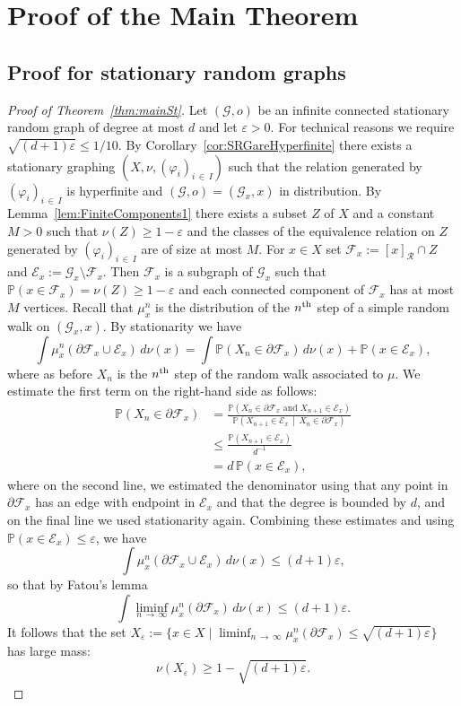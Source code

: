 \documentclass[10pt]{amsart}
\theoremstyle{definition}\newtheorem{defi}[theo]{Definition}\newtheorem{rema}[theo]{Remark}\newtheorem{exam}[theo]{Example}\newtheorem{exem}[theo]{Example}\newtheorem{nota}[theo]{Notation}
\newcommand{\bbP}{\mathbb{P}}
\newcommand{\calR}{\mathcal{R}}
\newcommand{\calE}{\mathcal{E}}
\newcommand{\calF}{\mathcal{F}}
\newcommand{\calG}{\mathcal{G}}
\begin{document}
\section{Proof of the Main Theorem}\label{sec:main_proof}

\subsection{Proof for stationary random graphs}\label{sec:stat_proof}

\begin{proof}[{Proof of Theorem~\ref{thm:mainSt}}]
Let $(\calG,o)$ be an infinite connected stationary random graph of degree at most $d$ and let $\varepsilon>0$. For technical reasons we require $\sqrt{(d+1)\varepsilon}\leq 1/10.$ By Corollary~\ref{cor:SRGareHyperfinite} there exists a stationary graphing $(X,\nu,(\varphi_i)_{i\,\in\,I})$ such that the relation generated by $ (\varphi_i)_{i\,\in\,I}$ is hyperfinite and $(\calG,o)=(\calG_x,x)$ in distribution. By Lemma~\ref{lem:FiniteComponents1} there exists a subset $Z$ of $X$ and a constant $M>0$ such that $\nu(Z)\geq 1-\varepsilon$ and the classes of the equivalence relation on $Z$ generated by $(\varphi_i)_{i\,\in\,I}$ are of size at most $M$. For $x\in X$ set $\calF_x:=[x]_{\calR}\cap Z$ and $\calE_x:=\calG_x\setminus \calF_x$. Then $\calF_x$ is a subgraph of $\calG_x$ such that $\bbP(x\in \calF_x)=\nu(Z)\geq 1-\varepsilon$ and each connected component of $\calF_x$ has at most $M$ vertices. Recall that $\mu_x^n$ is the distribution of the $n^{\rm th}$ step of a simple random walk on $(\calG_x,x)$. By stationarity we have
\[
\int \mu_x^n(\partial \calF_x\cup \calE_x) \, d\nu(x)=\int \bbP(X_n\in \partial \calF_x) \, d\nu(x) +\bbP(x\in \calE_x),
\]
where as before $X_n$ is the $n^{\rm th}$ step of the random walk associated to $\mu$. We estimate the first term on the right-hand side as follows:
\begin{align*}
\bbP(X_n\in \partial \calF_x)&=\frac{\bbP\left(X_n\in \partial \calF_x \text{ and } X_{n+1}\in \calE_x\right)}{\bbP\left(X_{n+1}\in \calE_x \,\middle|\, X_n \in \partial \calF_x\right)}\\
&\leq \frac{\bbP(X_{n+1}\in \calE_x)}{d^{-1}}\\
&=d \, \bbP(x\in \calE_x),
\end{align*}
where on the second line, we estimated the denominator using that any point in $\partial \calF_x$ has an edge with endpoint in $\calE_x$ and that the degree is bounded by $d$, and on the final line we used stationarity again. Combining these estimates and using $\bbP(x\in \calE_x)\leq \varepsilon$, we have
\[
\int \mu_x^n(\partial \calF_x\cup \calE_x) \, d\nu(x) \leq (d+1)\varepsilon,
\]
so that by Fatou's lemma
\[
\int \liminf_{n\,\to\,\infty} \mu_x^n(\partial \calF_x) \, d\nu(x)\leq (d+1)\varepsilon.
\]
It follows that the set $\displaystyle X_\varepsilon:=\{x\in X \mid \liminf_{n\,\to\,\infty} \mu_x^n(\partial \calF_x)\leq \sqrt{(d+1)\varepsilon}\}$ has large mass:
\begin{equation}\label{eqn:MeasureOfGoodSet}
\nu(X_\varepsilon)\geq 1-\sqrt{(d+1)\varepsilon}.
\end{equation}


\end{proof}
\end{document}
